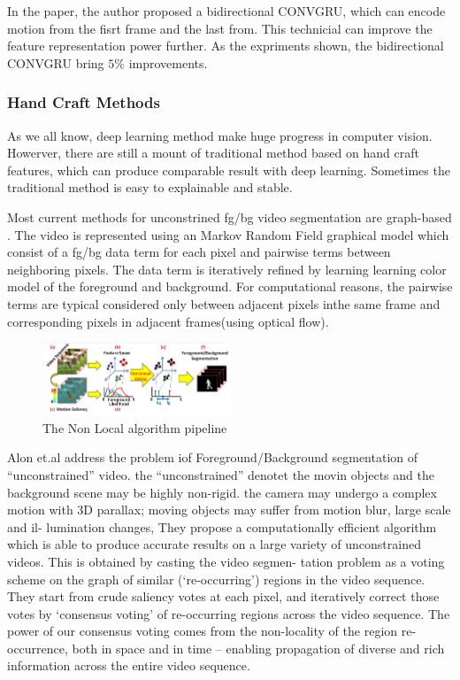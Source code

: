 In the paper, the author proposed a bidirectional CONVGRU, which can encode motion from the fisrt frame and the last from. This technicial can improve the feature
representation power further. As the expriments shown, the bidirectional CONVGRU bring $5\%$ improvements.

\subsubsection{Hand Craft Methods}

As we all know, deep learning method make huge progress in computer vision. Howerver, there are still a mount of traditional method based on 
hand craft features, which can produce comparable result with deep learning. Sometimes the traditional method is easy to explainable and stable.

Most current methods for unconstrined fg/bg video segmentation are graph-based \cite{Lee2011Key, Papazoglou2013Fast, zhang2013video}. The video
is represented using an Markov Random Field graphical model which consist of a fg/bg data term for each pixel and pairwise
terms between neighboring pixels. The data term is iteratively refined by learning learning color model of the foreground
and background. For computational reasons, the pairwise  terms are typical considered only between adjacent pixels inthe same 
frame and corresponding pixels in adjacent frames(using optical flow).

\begin{figure}[ht]
    \centering
    \includegraphics[width=0.5\textwidth]{figure/NLC.png}
    \caption{The Non Local algorithm pipeline}
    \label{nlc}
\end{figure}

Alon et.al \cite{Faktor2014Video} address the problem iof Foreground/Background segmentation of “unconstrained”
video. the ``unconstrained'' denotet the movin objects and the background scene may be highly non-rigid.  
the camera may undergo a complex motion with 3D parallax; moving objects may suffer from motion blur, large scale and il-
lumination changes, They propose a computationally efficient algorithm which is able to produce accurate results
on a large variety of unconstrained videos. This is obtained by casting the video segmen-
tation problem as a voting scheme on the graph of similar (‘re-occurring’) regions in the
video sequence. They start from crude saliency votes at each pixel, and iteratively correct
those votes by ‘consensus voting’ of re-occurring regions across the video sequence. The
power of our consensus voting comes from the non-locality of the region re-occurrence,
both in space and in time – enabling propagation of diverse and rich information across
the entire video sequence.


